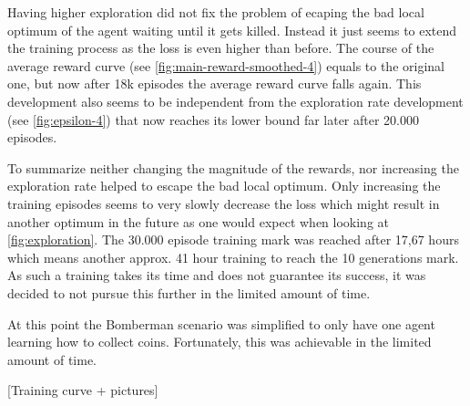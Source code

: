 Having higher exploration did not fix the problem of ecaping the bad local optimum of the agent waiting until it gets killed. Instead it just seems to extend the training process as the loss is even higher than before. The course of the average reward curve (see \autoref{fig:main-reward-smoothed-4}) equals to the original one, but now after 18k episodes the average reward curve falls again. This development also seems to be independent from the exploration rate development (see \autoref{fig:epsilon-4}) that now reaches its lower bound far later after 20.000 episodes. 

To summarize neither changing the magnitude of the rewards, nor increasing the exploration rate helped to escape the bad local optimum. Only increasing the training episodes seems to very slowly decrease the loss which might result in another optimum in the future as one would expect when looking at \autoref{fig:exploration}. The 30.000 episode training mark was reached after 17,67 hours which means another approx. 41 hour training to reach the 10 generations mark. As such a training takes its time and does not guarantee its success, it was decided to not pursue this further in the limited amount of time. 

At this point the Bomberman scenario was simplified to only have one agent learning how to collect coins. Fortunately, this was achievable in the limited amount of time. 

[Training curve + pictures]



